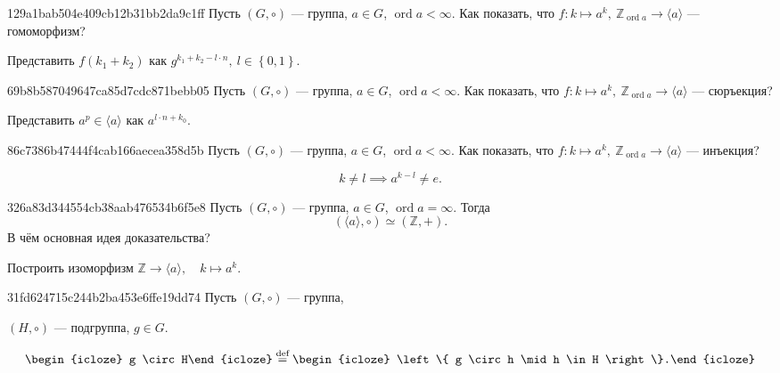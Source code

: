 \begin{note}{129a1bab504e409cb12b31bb2da9c1ff}
    Пусть \({ (G, \circ)}\) --- группа, \({ a \in G }\), \({ \operatorname{ord} a < \infty }\).
    Как показать, что \({ f : k \mapsto a^{k},\: \mathbb Z_{\operatorname{ord} a} \to \langle a \rangle }\) --- гомоморфизм?

    \begin{cloze}{1}
        Представить \({ f(k_1 + k_2) }\) как \({ g^{k_1 + k_2 - l \cdot n},\: l \in \left\{ 0, 1 \right\} }\).
    \end{cloze}
\end{note}

\begin{note}{69b8b587049647ca85d7cdc871bebb05}
    Пусть \({ (G, \circ)}\) --- группа, \({ a \in G }\), \({ \operatorname{ord} a < \infty }\).
    Как показать, что \({ f : k \mapsto a^{k},\: \mathbb Z_{\operatorname{ord} a} \to \langle a \rangle }\) --- сюръекция?

    \begin{cloze}{1}
        Представить \({ a^{p} \in \langle a \rangle }\) как \({ a^{l \cdot n + k_0} }\).
    \end{cloze}
\end{note}

\begin{note}{86c7386b47444f4cab166aecea358d5b}
    Пусть \({ (G, \circ)}\) --- группа, \({ a \in G }\), \({ \operatorname{ord} a < \infty }\).
    Как показать, что \({ f : k \mapsto a^{k},\: \mathbb Z_{\operatorname{ord} a} \to \langle a \rangle }\) --- инъекция?

    \begin{cloze}{1}
        \[
            k \neq l \implies a^{k - l} \neq e.
        \]
    \end{cloze}
\end{note}

\begin{note}{326a83d344554cb38aab476534b6f5e8}
    Пусть \({ (G, \circ)}\) --- группа, \({ a \in G }\), \({ \operatorname{ord} a = \infty }\).
    Тогда
    \[
        (\langle a \rangle, \circ) \simeq (\mathbb Z, +).
    \]
    В чём основная идея доказательства?

    \begin{cloze}{1}
        Построить изоморфизм \({ \mathbb Z \to \langle a \rangle, \quad k \mapsto a^{k} }\).
    \end{cloze}
\end{note}

\begin{note}{31fd624715c244b2ba453e6ffe19dd74}
    Пусть \({ (G, \circ) }\) --- группа, \begin{icloze}{3}\({ (H, \circ) }\) --- подгруппа,\: \({ g \in G }\).\end{icloze}
    \[
        \begin{icloze}{2}g \circ H\end{icloze} \overset{\text{def}}= \begin{icloze}{1}\left\{ g \circ h \mid h \in H \right\}.\end{icloze}
    \]
\end{note}

